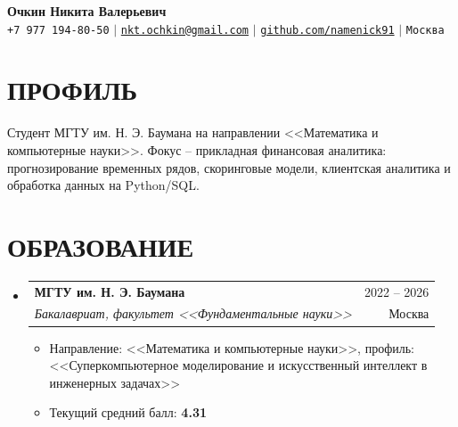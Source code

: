 \documentclass[letterpaper,11pt]{article}
\makeatletter
\newcommand{\resumeItem}[1]{
  \item\small{
    {#1 \vspace{-1pt}}
  }
}
\newcommand{\resumeSubheading}[4]{
  \vspace{-1pt}\item
    \begin{tabular*}{\textwidth}[t]{l@{\extracolsep{\fill}}r}
      \textbf{#1} & {\color{dark-grey}\small #2}\vspace{1pt}\\ %
      \textit{#3} & {\color{dark-grey} \small #4}\\ %
    \end{tabular*}\vspace{-4pt}
}
\newcommand{\resumeSubHeadingListStart}{\begin{itemize}[leftmargin=0in, label={}]}
\newcommand{\resumeSubHeadingListEnd}{\end{itemize}}
\newcommand{\resumeItemListStart}{\begin{itemize}}
\newcommand{\resumeItemListEnd}{\end{itemize}\vspace{0pt}}
\makeatother
\begin{document}
\begin{center}
    \textbf{\Large Очкин Никита Валерьевич} \\ \vspace{5pt}
    \small \texttt{+7 977 194-80-50} \hspace{1pt} $|$
    \hspace{1pt} \href{mailto:nkt.ochkin@gmail.com}{\texttt{nkt.ochkin@gmail.com}} \hspace{1pt} $|$
    \hspace{1pt} \href{https://github.com/namenick91}{\texttt{github.com/namenick91}} \hspace{1pt} $|$
    \hspace{1pt} \texttt{Москва}
    \\ \vspace{-3pt}
\end{center}

\section{ПРОФИЛЬ}
 \begin{itemize}[leftmargin=0in, label={}]
    \small{\item{
     Студент МГТУ им. Н. Э. Баумана на направлении <<Математика и компьютерные науки>>. Фокус -- прикладная финансовая аналитика: прогнозирование временных рядов, скоринговые модели, клиентская аналитика и обработка данных на Python/SQL.
    }}
 \end{itemize}

\section{ОБРАЗОВАНИЕ}
  \resumeSubHeadingListStart
    \resumeSubheading
      {МГТУ им. Н. Э. Баумана}{2022 -- 2026}
      {Бакалавриат, факультет <<Фундаментальные науки>>}{Москва}
        \resumeItemListStart
          \resumeItem{Направление: <<Математика и компьютерные науки>>, профиль: <<Суперкомпьютерное моделирование и искусственный интеллект в инженерных задачах>>}
          \resumeItem{Текущий средний балл: \textbf{4.31}}
        \resumeItemListEnd
  \resumeSubHeadingListEnd


\end{document}
